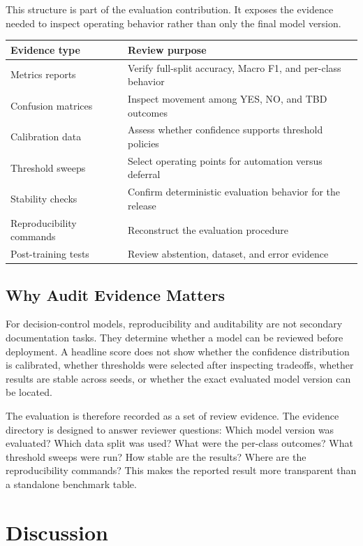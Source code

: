 \documentclass[11pt]{article}
\begin{document}
This structure is part of the evaluation contribution. It exposes the evidence needed to inspect operating behavior rather than only the final model version.

\begin{center}
\begin{tabular}{ll}
\toprule
Evidence type & Review purpose \\
\midrule
Metrics reports & Verify full-split accuracy, Macro F1, and per-class behavior \\
Confusion matrices & Inspect movement among YES, NO, and TBD outcomes \\
Calibration data & Assess whether confidence supports threshold policies \\
Threshold sweeps & Select operating points for automation versus deferral \\
Stability checks & Confirm deterministic evaluation behavior for the release \\
Reproducibility commands & Reconstruct the evaluation procedure \\
Post-training tests & Review abstention, dataset, and error evidence \\
\bottomrule
\end{tabular}
\end{center}

\subsection{Why Audit Evidence Matters}

For decision-control models, reproducibility and auditability are not secondary documentation tasks. They determine whether a model can be reviewed before deployment. A headline score does not show whether the confidence distribution is calibrated, whether thresholds were selected after inspecting tradeoffs, whether results are stable across seeds, or whether the exact evaluated model version can be located.

The evaluation is therefore recorded as a set of review evidence. The evidence directory is designed to answer reviewer questions: Which model version was evaluated? Which data split was used? What were the per-class outcomes? What threshold sweeps were run? How stable are the results? Where are the reproducibility commands? This makes the reported result more transparent than a standalone benchmark table.

\section{Discussion}
\end{document}
